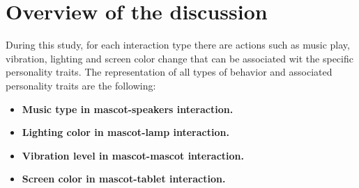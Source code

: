 \section{Overview of the discussion}
\label{sec:overview-of-the-discussion}

During this study, for each interaction type there are actions such as music play, vibration, lighting and
screen color change that can be associated wit the specific personality traits.
The representation of all types of behavior and associated personality traits are the following:

\begin{itemize}
    \renewcommand{\labelitemi}{$\Rightarrow$}
    \item \textbf{Music type in mascot-speakers interaction.}

    \item \textbf{Lighting color in mascot-lamp interaction.}

    \item \textbf{Vibration level in mascot-mascot interaction.}

    \item \textbf{Screen color in mascot-tablet interaction.}
\end{itemize}